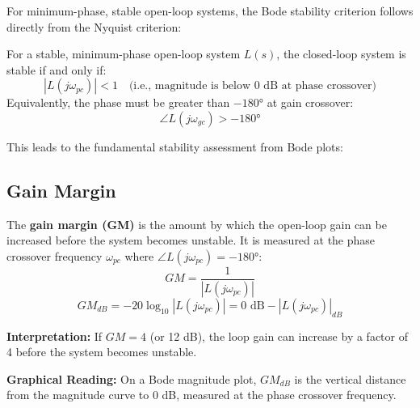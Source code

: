 For minimum-phase, stable open-loop systems, the Bode stability criterion follows directly from the Nyquist criterion:

\begin{theorem}
\label{thm:bode_stability}
For a stable, minimum-phase open-loop system $L(s)$, the closed-loop system is stable if and only if:
\begin{equation}
|L(j\omega_{pc})| < 1 \quad \text{(i.e., magnitude is below 0 dB at phase crossover)}
\end{equation}
Equivalently, the phase must be greater than $-180°$ at gain crossover:
\begin{equation}
\angle L(j\omega_{gc}) > -180°
\end{equation}
\end{theorem}

This leads to the fundamental stability assessment from Bode plots:


\subsection{Gain Margin}

\begin{definition}
\label{def:gain_margin}
The \textbf{gain margin (GM)} is the amount by which the open-loop gain can be increased before the system becomes unstable. It is measured at the phase crossover frequency $\omega_{pc}$ where $\angle L(j\omega_{pc}) = -180°$:
\begin{equation}
GM = \frac{1}{|L(j\omega_{pc})|}
\end{equation}
\begin{equation}
GM_{dB} = -20\log_{10}|L(j\omega_{pc})| = 0\text{ dB} - |L(j\omega_{pc})|_{dB}
\end{equation}
\end{definition}

\textbf{Interpretation:} If $GM = 4$ (or 12 dB), the loop gain can increase by a factor of 4 before the system becomes unstable.

\textbf{Graphical Reading:} On a Bode magnitude plot, $GM_{dB}$ is the vertical distance from the magnitude curve to 0 dB, measured at the phase crossover frequency.

